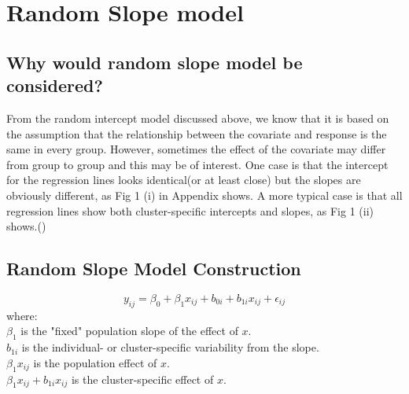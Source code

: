 \documentclass[12pt]{article}
\title{}
\author{Shanshan Song}
\date{10 February 2019}
\begin{document}
\maketitle
\section{Random Slope model}
\subsection{Why would random slope model be considered?}
From the random intercept model discussed above, we know that it is based on the assumption that the relationship between the covariate and response is the same in every group. However, sometimes the effect of the covariate may differ from group to group and this may be of interest. One case is that the intercept for the regression lines looks identical(or at least close) but the slopes are obviously different, as Fig 1 (i) in Appendix shows. A more typical case is that all regression lines show both cluster-specific intercepts and slopes, as Fig 1 (ii) shows.(\cite{Fahrmeir})
\subsection{Random Slope Model Construction}
\begin{equation}
    y_{ij} = \beta_0 + \beta_1x_{ij} + b_{0i} + b_{1i}x_{ij} + \epsilon_{ij} 
\end{equation}
where:
\\ $\beta_1$ is the "fixed" population slope of the effect of $x$.
\\ $b_{1i}$ is the individual- or cluster-specific variability from the slope.
\\ $\beta_1x_{ij}$ is the population effect of $x$.
\\ $\beta_1x_{ij} + b_{1i}x_{ij}$ is the cluster-specific effect of $x$.
\end{document}
